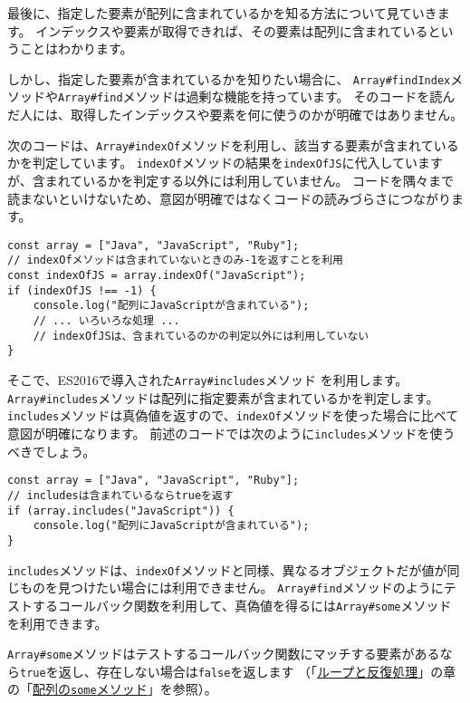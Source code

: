 最後に、指定した要素が配列に含まれているかを知る方法について見ていきます。
インデックスや要素が取得できれば、その要素は配列に含まれているということはわかります。

しかし、指定した要素が含まれているか\textbf{}を知りたい場合に、
\texttt{Array\#findIndex}メソッドや\texttt{Array\#find}メソッドは過剰な機能を持っています。
そのコードを読んだ人には、取得したインデックスや要素を何に使うのかが明確ではありません。

次のコードは、\texttt{Array\#indexOf}メソッドを利用し、該当する要素が含まれているかを判定しています。
\texttt{indexOf}メソッドの結果を\texttt{indexOfJS}に代入していますが、含まれているかを判定する以外には利用していません。
コードを隅々まで読まないといけないため、意図が明確ではなくコードの読みづらさにつながります。

\begin{lstlisting}
const array = ["Java", "JavaScript", "Ruby"];
// indexOfメソッドは含まれていないときのみ-1を返すことを利用
const indexOfJS = array.indexOf("JavaScript");
if (indexOfJS !== -1) {
    console.log("配列にJavaScriptが含まれている");
    // ... いろいろな処理 ...
    // indexOfJSは、含まれているのかの判定以外には利用していない
}
\end{lstlisting}

そこで、ES2016で導入された\texttt{Array\#includes}メソッド\,\protect{}\,を利用します。
\texttt{Array\#includes}メソッドは配列に指定要素が含まれているかを判定します。
\texttt{includes}メソッドは真偽値を返すので、\texttt{indexOf}メソッドを使った場合に比べて意図が明確になります。
前述のコードでは次のように\texttt{includes}メソッドを使うべきでしょう。

\begin{lstlisting}
const array = ["Java", "JavaScript", "Ruby"];
// includesは含まれているならtrueを返す
if (array.includes("JavaScript")) {
    console.log("配列にJavaScriptが含まれている");
}
\end{lstlisting}

\texttt{includes}メソッドは、\texttt{indexOf}メソッドと同様、異なるオブジェクトだが値が同じものを見つけたい場合には利用できません。
\texttt{Array\#find}メソッドのようにテストするコールバック関数を利用して、真偽値を得るには\texttt{Array\#some}メソッドを利用できます。

\texttt{Array\#some}メソッドはテストするコールバック関数にマッチする要素があるなら\texttt{true}を返し、存在しない場合は\texttt{false}を返します
（「\hyperlink{loop-and-iteration}{ループと反復処理}」の章の「\hyperlink{array-some}{配列の\texttt{some}メソッド}」を参照）。

